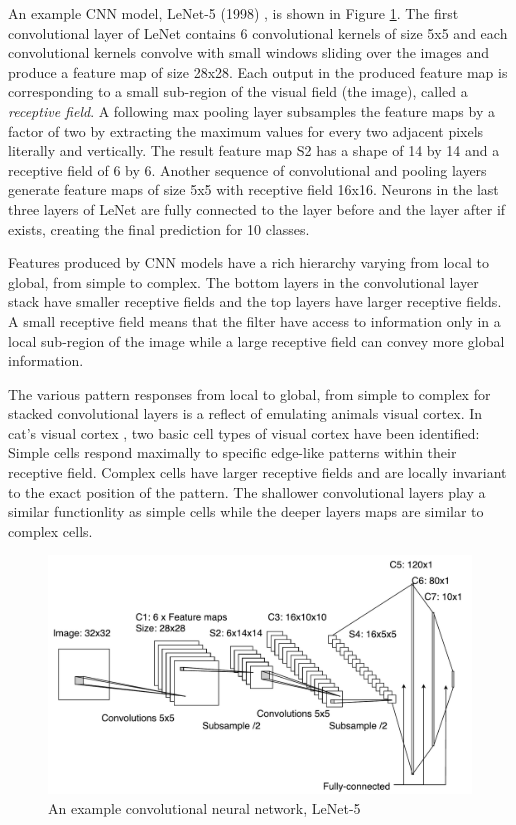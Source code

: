 
An example CNN model, LeNet-5 (1998) \cite{lecun1998gradient}, is shown in Figure \ref{fig:lenet}.
The first convolutional layer of LeNet contains 6 convolutional kernels of size 5x5 and each convolutional kernels convolve with small windows sliding over the images and produce a feature map of size 28x28.
Each output in the produced feature map is corresponding to a small sub-region of the visual field (the image), called a \textit{receptive field}.
A following max pooling layer subsamples the feature maps by a factor of two by extracting the maximum values for every two adjacent pixels literally and vertically.
The result feature map S2 has a shape of 14 by 14 and a receptive field of 6 by 6.
Another sequence of convolutional and pooling layers generate feature maps of size 5x5 with receptive field 16x16.
Neurons in the last three layers of LeNet are fully connected to the layer before and the layer after if exists, creating the final prediction for 10 classes.

Features produced by CNN models have a rich hierarchy varying from local to global, from simple to complex.
The bottom layers in the convolutional layer stack have smaller receptive fields and the top layers have larger receptive fields.
A small receptive field means that the filter have access to information only in a local sub-region of the image while a large receptive field can convey more global information.

The various pattern responses from local to global, from simple to complex for stacked convolutional layers is a reflect of emulating animals visual cortex.
In cat's visual cortex \cite{hubel1962receptive}, two basic cell types of visual cortex have been identified:
Simple cells respond maximally to specific edge-like patterns within their receptive field.
Complex cells have larger receptive fields and are locally invariant to the exact position of the pattern.
The shallower convolutional layers play a similar functionlity as simple cells while the deeper layers maps are similar to complex cells.

\begin{figure}[t]
\centering
   \includegraphics[width=\linewidth]{img/lenet}
\caption{An example convolutional neural network, LeNet-5 \cite{lecun1998gradient}}
\label{fig:lenet}
\end{figure}

